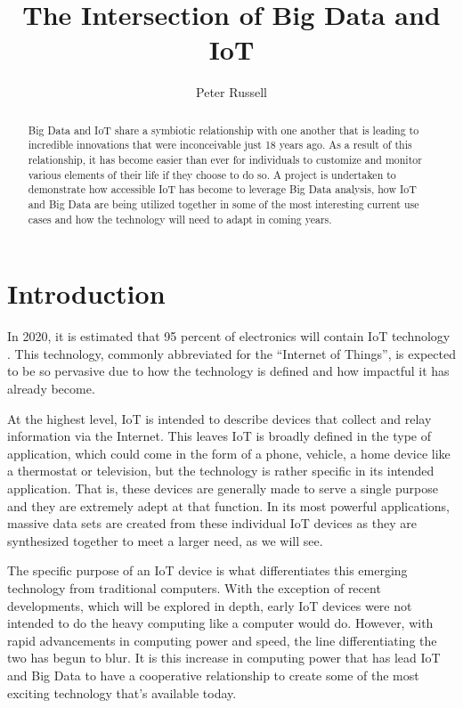 \documentclass[sigconf]{acmart}
\begin{document}
\title{The Intersection of Big Data and IoT}

\author{Peter Russell}

\begin{abstract}

Big Data and IoT share a symbiotic relationship with one another that is leading to incredible innovations that were inconceivable just 18 years ago. As a result of this relationship, it has become easier than ever for individuals to customize and monitor various elements of their life if they choose to do so. A project is undertaken to demonstrate how accessible IoT has become to leverage Big Data analysis, how IoT and Big Data are being utilized together in some of the most interesting current use cases and how the technology will need to adapt in coming years. 

\end{abstract}


\maketitle

\section{Introduction}
In 2020, it is estimated that 95 percent of electronics will contain IoT technology \cite{gartner95}. This technology, commonly abbreviated for the ``Internet of Things'', is expected to be so pervasive due to how the technology is defined and how impactful it has already become. 

At the highest level, IoT is intended to describe devices that collect and relay information via the Internet. This leaves IoT is broadly defined in the type of application, which could come in the form of a phone, vehicle, a home device like a thermostat or television, but the technology is rather specific in its intended application. That is, these devices are generally made to serve a single purpose and they are extremely adept at that function. In its most powerful applications, massive data sets are created from these individual IoT devices as they are synthesized together to meet a larger need, as we will see.  

The specific purpose of an IoT device is what differentiates this emerging technology from traditional computers. With the exception of recent developments, which will be explored in depth, early IoT devices were not intended to do the heavy computing like a computer would do. However, with rapid advancements in computing power and speed, the line differentiating the two has begun to blur. It is this increase in computing power that has lead IoT and Big Data to have a cooperative relationship to create some of the most exciting technology that's available today. 
\end{document}
